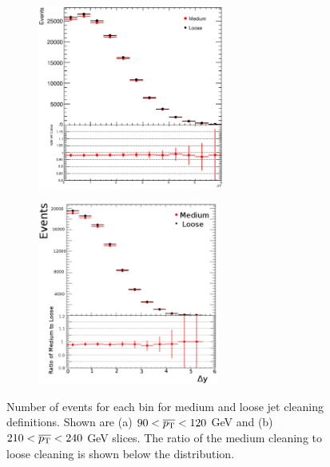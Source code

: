 \begin{figure}
\centering
        \begin{subfigure}[b]{0.5\textwidth}
                \centering
                \includegraphics[height=6cm,width=\textwidth]{figures/GBJ1/JetCleaning/Inclusive_selA_Ave_pT_90_120.eps}
        \end{subfigure}%
        \begin{subfigure}[b]{0.5\textwidth}
                \centering
                \includegraphics[height=6cm,width=\textwidth]{figures/GBJ1/JetCleaning/Inclusive_selA_Ave_pT_210_240.eps}
        \end{subfigure}%
\caption[Effect of jet cleaning on the inclusive distribution in \dy{}]{
Number of events for each \dy{} bin for medium and loose jet cleaning definitions. 
Shown are (a) $90<\mbox{$\overline{p_{\rm T}}$}{}<120$ GeV and (b) $210<\mbox{$\overline{p_{\rm T}}$}{}<240$ GeV slices.
The ratio of the medium cleaning to loose cleaning is shown below the distribution.
\label{JetCleanIncl_dy}}
\end{figure}

